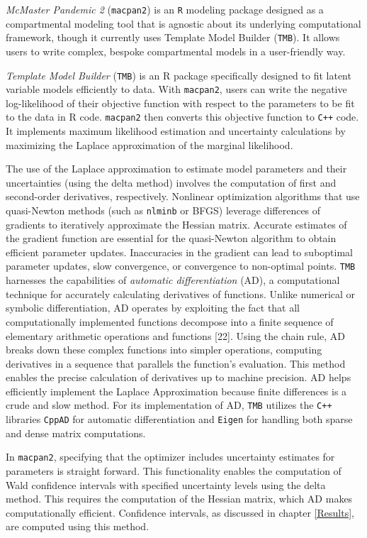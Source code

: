 \documentclass[
11pt, %
oneside, %
english, %
singlespacing, %
]{macthesis} %
\begin{document}
\emph{McMaster Pandemic 2} (\texttt{macpan2}) is an \texttt{R} modeling package designed as a compartmental modeling tool that is agnostic about its underlying computational framework, though it currently uses Template Model Builder (\texttt{TMB}). It allows users to write complex, bespoke compartmental models in a user-friendly way.

\emph{Template Model Builder} (\texttt{TMB}) is an R package specifically designed to fit latent variable models efficiently to data. With \texttt{macpan2}, users can write the negative log-likelihood of their objective function with respect to the parameters to be fit to the data in R code. \texttt{macpan2} then converts this objective function to \texttt{C++} code. It implements maximum likelihood estimation and uncertainty calculations by maximizing the Laplace approximation of the marginal likelihood.

The use of the Laplace approximation to estimate model parameters and their uncertainties (using the delta method) involves the computation of first and second-order derivatives, respectively. Nonlinear optimization algorithms that use quasi-Newton methods (such as \texttt{nlminb} or BFGS) leverage differences of gradients to iteratively approximate the Hessian matrix. Accurate estimates of the gradient function are essential for the quasi-Newton algorithm to obtain efficient parameter updates. Inaccuracies in the gradient can lead to suboptimal parameter updates, slow convergence, or convergence to non-optimal points. \texttt{TMB} harnesses the capabilities of \emph{automatic differentiation} (AD), a computational technique for accurately calculating derivatives of functions. Unlike numerical or symbolic differentiation, AD operates by exploiting the fact that all computationally implemented functions decompose into a finite sequence of elementary arithmetic operations and functions {[}22{]}. Using the chain rule, AD breaks down these complex functions into simpler operations, computing derivatives in a sequence that parallels the function's evaluation. This method enables the precise calculation of derivatives up to machine precision. AD helps efficiently implement the Laplace Approximation because finite differences is a crude and slow method. For its implementation of AD, \texttt{TMB} utilizes the \texttt{C++} libraries \texttt{CppAD} for automatic differentiation and \texttt{Eigen} for handling both sparse and dense matrix computations.

In \texttt{macpan2}, specifying that the optimizer includes uncertainty estimates for parameters is straight forward. This functionality enables the computation of Wald confidence intervals with specified uncertainty levels using the delta method. This requires the computation of the Hessian matrix, which AD makes computationally efficient. Confidence intervals, as discussed in chapter \ref{Results}, are computed using this method.
\end{document}
